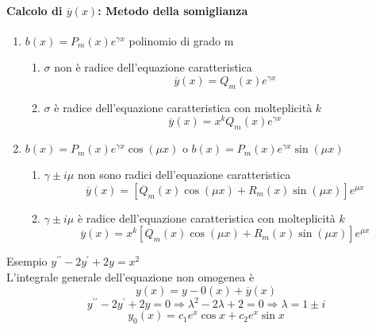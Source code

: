 \paragraph{Calcolo di $\overline{y}(x)$: Metodo della somiglianza}
\begin{enumerate}
	\item $b(x)=P_m(x)e^{\gamma x}$ polinomio di grado m
		\begin{enumerate}
			\item $\sigma$ non è radice dell'equazione caratteristica
				\begin{equation}
					\overline{y}(x)=Q_m(x)e^{\gamma x}
				\end{equation}
			\item $\sigma$ è radice dell'equazione caratteristica con molteplicità $k$
				\begin{equation*}
					\overline{y}(x)=x^kQ_m(x)e^{\gamma x}
				\end{equation*}
			
		\end{enumerate}
	\item $b(x)=P_m(x)e^{\gamma x}\cos(\mu x) \text{ o } b(x)=P_m(x)e^{\gamma x}\sin(\mu x)$
		\begin{enumerate}
			\item $\gamma\pm i\mu$ non sono radici dell'equazione caratteristica
			\begin{equation*}
				\overline{y}(x)=[Q_m(x)\cos(\mu x)+R_m(x)\sin(\mu x)]e^{\mu x}
			\end{equation*}
			\item $\gamma\pm i\mu$  è radice dell'equazione caratteristica con molteplicità $k$
			\begin{equation*}
				\overline{y}(x)=x^k[Q_m(x)\cos(\mu x)+R_m(x)\sin(\mu x)]e^{\mu x}
			\end{equation*}
		\end{enumerate}
\end{enumerate}
Esempio $y^{\prime\prime}-2y^\prime+2y=x^2$\\
L'integrale generale dell'equazione non omogenea è
\begin{equation*}
	\boxed{y(x)=y-0(x)+\overline{y}(x)}
\end{equation*}
\begin{equation*}
	y^{\prime\prime}-2y^\prime+2y=0\Rightarrow\lambda^2-2\lambda+2=0\Rightarrow \lambda=1\pm i
\end{equation*}
\begin{equation*}
	y_0(x)=c_1e^x\cos x+c_2e^x\sin x
\end{equation*}

